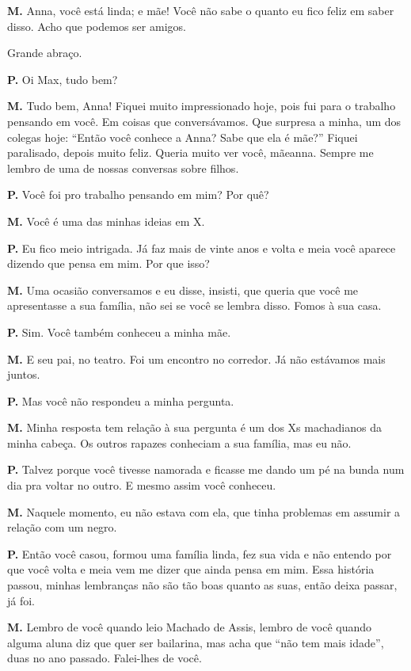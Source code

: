 {\parindent0pt\parskip1pt\raggedright
\textbf{M.} Anna, você está linda; e mãe! Você não sabe o quanto eu fico
feliz em saber disso. Acho que podemos ser amigos.

Grande abraço.

\textbf{P.} Oi Max, tudo bem?

\textbf{M.} Tudo bem, Anna! Fiquei muito impressionado hoje, pois fui
para o trabalho pensando em você. Em coisas que conversávamos. Que
surpresa a minha, um dos colegas hoje: ``Então você conhece a Anna? Sabe
que ela é mãe?'' Fiquei paralisado, depois muito feliz. Queria muito ver
você, mãeanna. Sempre me lembro de uma de nossas conversas sobre filhos.

\textbf{P.} Você foi pro trabalho pensando em mim? Por quê?

\textbf{M.} Você é uma das minhas ideias em X.

\textbf{P.} Eu fico meio intrigada. Já faz mais de vinte anos e volta e
meia você aparece dizendo que pensa em mim. Por que isso?

\textbf{M.} Uma ocasião conversamos e eu disse, insisti, que queria que
você me apresentasse a sua família, não sei se você se lembra disso.
Fomos à sua casa.

\textbf{P.} Sim. Você também conheceu a minha mãe.

\textbf{M.} E seu pai, no teatro. Foi um encontro no corredor. Já não
estávamos mais juntos.

\textbf{P.} Mas você não respondeu a minha pergunta.

\textbf{M.} Minha resposta tem relação à sua pergunta é um dos Xs
machadianos da minha cabeça. Os outros rapazes conheciam a sua família,
mas eu não.

\textbf{P.} Talvez porque você tivesse namorada e ficasse me dando um pé
na bunda num dia pra voltar no outro. E mesmo assim você conheceu.

\textbf{M.} Naquele momento, eu não estava com ela, que tinha problemas
em assumir a relação com um negro.

\textbf{P.} Então você casou, formou uma família linda, fez sua vida e
não entendo por que você volta e meia vem me dizer que ainda pensa em
mim. Essa história passou, minhas lembranças não são tão boas quanto as
suas, então deixa passar, já foi.

\textbf{M.} Lembro de você quando leio Machado de Assis, lembro de você
quando alguma aluna diz que quer ser bailarina, mas acha que ``não tem
mais idade'', duas no ano passado. Falei-lhes de você.

}
